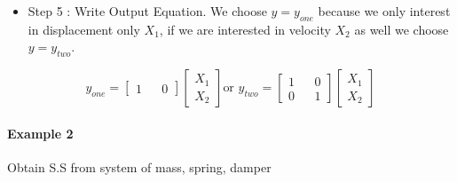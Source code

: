 \begin{itemize}
	\item Step 5 : Write Output Equation. We choose \(y=y_{one}\) because we only interest in displacement only \(X_1\), if we are interested in velocity \(X_2\) as well we choose \(y=y_{two}\).
\end{itemize}
\[
y_{one} =
\begin{bmatrix}
	1 &   & 0 
\end{bmatrix}
\begin{bmatrix}
	X_1 \\
	X_2 
\end{bmatrix} \text{or  }
y_{two} = 
\begin{bmatrix}
	1 &   & 0 \\
	0 &   & 1 
\end{bmatrix}
\begin{bmatrix}
	X_1 \\
	X_2 
\end{bmatrix}
\]



\paragraph{Example 2} Obtain S.S from system of mass, spring, damper

\begin{figure}[h]
	\centering
	
\end{figure}

